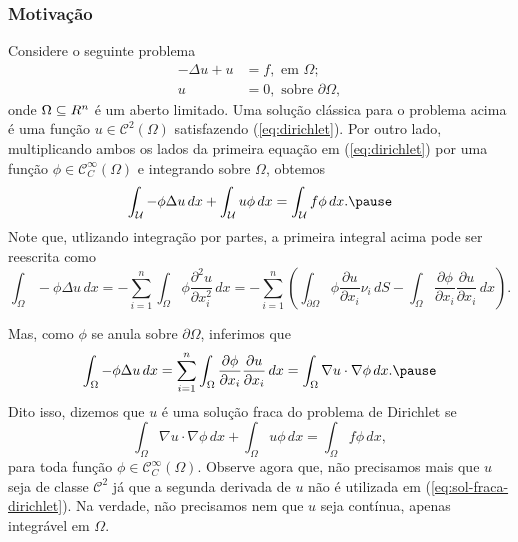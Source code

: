 \documentclass[xcolor=dvipsnames, aspectratio=169, 10pt]{beamer}
\let\mathbb\relax
\newcommand{\bR}{\mathbb{R}}
\newcommand{\cC}{\mathcal{C}}
\begin{document}
\begin{frame}
    \frametitle{Motivação}
    Considere o seguinte problema
    \begin{equation} \label{eq:dirichlet}
        \begin{aligned}
            -\Delta u + u &= f, \text{ em } \Omega;\\
            u &= 0, \text{ sobre } \partial\Omega,
        \end{aligned}
    \end{equation}
    onde $\Omega \subseteq \bR^n$ é um aberto limitado. \pause
    Uma solução clássica para o problema acima é uma função $u \in \cC^2(\Omega)$ satisfazendo (\ref{eq:dirichlet}). \pause
    Por outro lado, multiplicando ambos os lados da primeira equação em (\ref{eq:dirichlet}) por uma função $\phi \in \cC^{\infty}_C(\Omega)$ e integrando sobre $\Omega$, obtemos
    \[
        \int_{\mathcal U} - \phi \Delta u \,dx + \int_{\mathcal U} u \phi \,dx = \int_{\mathcal U} f \phi \,dx. \pause
    \]
    Note que, utlizando integração por partes, a primeira integral acima pode ser reescrita como
    \[
        \int_{\Omega} -\phi \Delta u \,dx = -\sum_{i=1}^n \int_{\Omega} \phi \frac{\partial^2 u}{\partial x_i^2} \,dx = -\sum_{i=1}^n \left( \int_{\partial\Omega} \phi \frac{\partial u}{\partial x_i} \nu_i \,dS - \int_{\Omega} \frac{\partial \phi}{\partial x_i} \frac{\partial u}{\partial x_i} \,dx\right).
    \]
\end{frame}
\begin{frame}
    Mas, como $\phi$ se anula sobre $\partial \Omega$, inferimos que
    \[
        \int_{\Omega} -\phi \Delta u \,dx = \sum_{i=1}^n \int_{\Omega} \frac{\partial \phi}{\partial x_i} \frac{\partial u}{\partial x_i} \,dx = \int_{\Omega} \nabla u \cdot \nabla \phi \,dx. \pause
    \]
    Dito isso, dizemos que $u$ é uma solução fraca do problema de Dirichlet se
    \begin{equation} \label{eq:sol-fraca-dirichlet}
        \int_{\Omega} \nabla u \cdot \nabla \phi \,dx + \int_{\Omega} u\phi \,dx = \int_{\Omega} f \phi \,dx,
    \end{equation}
    para toda função $\phi \in \cC^{\infty}_C(\Omega)$. \pause
    Observe agora que, não precisamos mais que $u$ seja de classe $\cC^2$ já que a segunda derivada de $u$ não é utilizada em (\ref{eq:sol-fraca-dirichlet}). Na verdade, não precisamos nem que $u$ seja contínua, apenas integrável em $\Omega$.
\end{frame}
\end{document}

